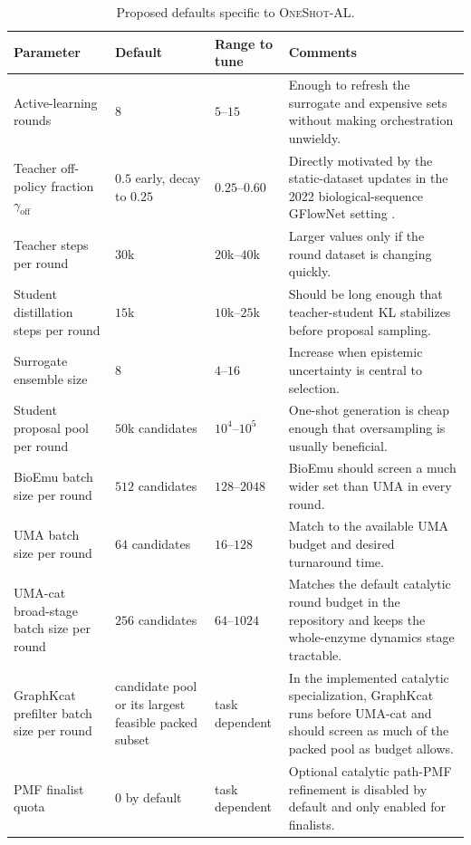\documentclass[11pt]{article}
\newcommand{\methodIII}{\textsc{OneShot-AL}}
\begin{document}
	\begin{table}[H]
		\centering
		\caption{Proposed defaults specific to \methodIII{}.}
		\label{tab:method3hyper}
		\begin{tabularx}{\textwidth}{>{\raggedright\arraybackslash}p{} >{\centering\arraybackslash}p{} >{\centering\arraybackslash}p{} X}
			\toprule
			Parameter & Default & Range to tune & Comments \\
			\midrule
			Active-learning rounds & $8$ & $5$--$15$ & Enough to refresh the surrogate and expensive sets without making orchestration unwieldy. \\
			Teacher off-policy fraction $\gamma_{\mathrm{off}}$ & $0.5$ early, decay to $0.25$ & $0.25$--$0.60$ & Directly motivated by the static-dataset updates in the 2022 biological-sequence GFlowNet setting \citep{jain2022bioseqgfn}. \\
			Teacher steps per round & $30$k & $20$k--$40$k & Larger values only if the round dataset is changing quickly. \\
			Student distillation steps per round & $15$k & $10$k--$25$k & Should be long enough that teacher-student KL stabilizes before proposal sampling. \\
			Surrogate ensemble size & $8$ & $4$--$16$ & Increase when epistemic uncertainty is central to selection. \\
			Student proposal pool per round & $50$k candidates & $10^4$--$10^5$ & One-shot generation is cheap enough that oversampling is usually beneficial. \\
			BioEmu batch size per round & $512$ candidates & $128$--$2048$ & BioEmu should screen a much wider set than UMA in every round. \\
			UMA batch size per round & $64$ candidates & $16$--$128$ & Match to the available UMA budget and desired turnaround time. \\
			UMA-cat broad-stage batch size per round & $256$ candidates & $64$--$1024$ & Matches the default catalytic round budget in the repository and keeps the whole-enzyme dynamics stage tractable. \\
			GraphKcat prefilter batch size per round & candidate pool or its largest feasible packed subset & task dependent & In the implemented catalytic specialization, GraphKcat runs before UMA-cat and should screen as much of the packed pool as budget allows. \\
			PMF finalist quota & $0$ by default & task dependent & Optional catalytic path-PMF refinement is disabled by default and only enabled for finalists. \\

\end{tabularx}
\end{table}
\end{document}
